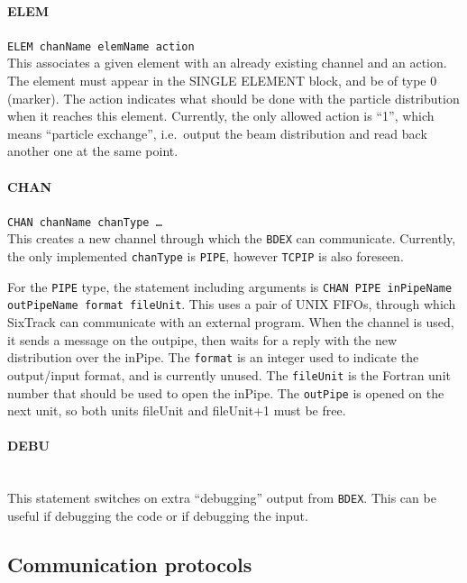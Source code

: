 \paragraph{ELEM} \texttt{ELEM chanName elemName action}\\

This associates a given element with an already existing channel and an action.
The element must appear in the SINGLE ELEMENT block, and be of type 0 (marker).
The action indicates what should be done with the particle distribution when it reaches this element.
Currently, the only allowed action is ``1'', which means ``particle exchange'', i.e.\ output the beam distribution and read back another one at the same point.

\paragraph{CHAN} \texttt{CHAN chanName chanType \ldots}\\

This creates a new channel through which the \texttt{BDEX} can communicate.
Currently, the only implemented \texttt{chanType} is \texttt{PIPE}, however \texttt{TCPIP} is also foreseen.

For the \texttt{PIPE} type, the statement including arguments is \texttt{CHAN PIPE inPipeName outPipeName format fileUnit}.
This uses a pair of UNIX FIFOs, through which SixTrack can communicate with an external program.
When the channel is used, it sends a message on the outpipe, then waits for a reply with the new distribution over the inPipe.
The \texttt{format} is an integer used to indicate the output/input format, and is currently unused.
The \texttt{fileUnit} is the Fortran unit number that should be used to open the inPipe.
The \texttt{outPipe} is opened on the next unit, so both units fileUnit and fileUnit+1 must be free.

\paragraph{DEBU}~\\

This statement switches on extra ``debugging'' output from \texttt{BDEX}.
This can be useful if debugging the code or if debugging the input.

\subsection{Communication protocols}

